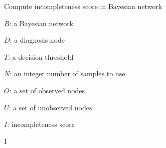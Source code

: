 \begin{algorithm}[h]
	\caption{Compute incompleteness score in Bayesian network}
	\label{algorithm:incompleteness}
	\begin{algorithmic}
		\Require
		
		$ B $: a Bayesian network
		
		$ D $: a diagnosis node
		
		$ T $: a decision threshold
		
		$ N $: an integer number of samples to use
		
		$ O $: a set of observed nodes
		
		$ U $: a set of unobserved nodes
		
		\Ensure $ I $: incompleteness score
		
		
		
		
			
			
			\EndIf
		\EndFor
		\State \Return I
		\EndFunction
		
	\end{algorithmic}
\end{algorithm}

